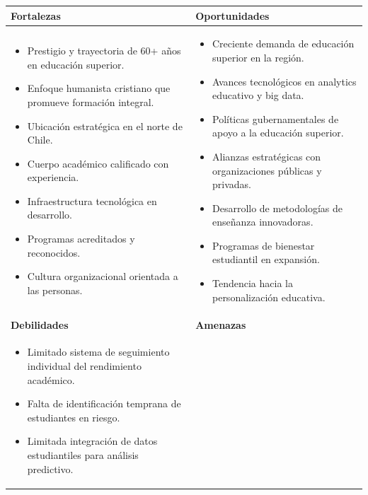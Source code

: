 \documentclass[12pt,letterpaper]{report}
\begin{document}
\begin{table}[H]
    \centering
    \begin{tabular}{|p{}|p{}|}
        \hline
        \textbf{Fortalezas} & \textbf{Oportunidades} \\
        \hline
        \begin{itemize}
            \item Prestigio y trayectoria de 60+ años en educación superior.
            \item Enfoque humanista cristiano que promueve formación integral.
            \item Ubicación estratégica en el norte de Chile.
            \item Cuerpo académico calificado con experiencia.
            \item Infraestructura tecnológica en desarrollo.
            \item Programas acreditados y reconocidos.
            \item Cultura organizacional orientada a las personas.
        \end{itemize} & 
        \begin{itemize}
            \item Creciente demanda de educación superior en la región.
            \item Avances tecnológicos en analytics educativo y big data.
            \item Políticas gubernamentales de apoyo a la educación superior.
            \item Alianzas estratégicas con organizaciones públicas y privadas.
            \item Desarrollo de metodologías de enseñanza innovadoras.
            \item Programas de bienestar estudiantil en expansión.
            \item Tendencia hacia la personalización educativa.
        \end{itemize} \\
        \hline
        \textbf{Debilidades} & \textbf{Amenazas} \\
        \hline
        \begin{itemize}
            \item Limitado sistema de seguimiento individual del rendimiento académico.
            \item Falta de identificación temprana de estudiantes en riesgo.
            \item Limitada integración de datos estudiantiles para análisis predictivo.

\end{itemize}
\end{tabular}
\end{table}
\end{document}
